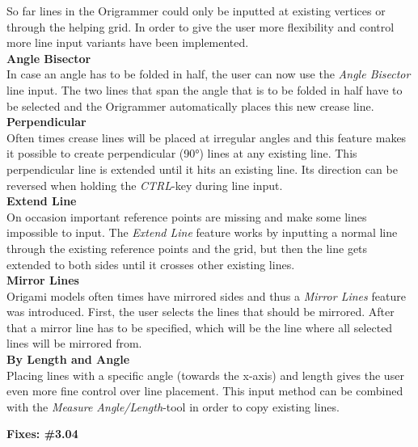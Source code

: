 So far lines in the Origrammer could only be inputted at existing vertices or through the helping grid. In order to give the user more flexibility and control more line input variants have been implemented.\\
\newline
\noindent \textbf{Angle Bisector}\\
\noindent In case an angle has to be folded in half, the user can now use the \emph{Angle Bisector} line input. The two lines that span the angle that is to be folded in half have to be selected and the Origrammer automatically places this new crease line.\\
\newline
\noindent \textbf{Perpendicular}\\
\noindent Often times crease lines will be placed at irregular angles and this feature makes it possible to create perpendicular (90°) lines at any existing line. This perpendicular line is extended until it hits an existing line. Its direction can be reversed when holding the \emph{CTRL}-key during line input.\\
\newline
\noindent \textbf{Extend Line}\\
\noindent On occasion important reference points are missing and make some lines impossible to input. The \emph{Extend Line} feature works by inputting a normal line through the existing reference points and the grid, but then the line gets extended to both sides until it crosses other existing lines.\\
\newline
\noindent \textbf{Mirror Lines}\\
\noindent Origami models often times have mirrored sides and thus a \emph{Mirror Lines} feature was introduced. First, the user selects  the lines that should be mirrored. After that a mirror line has to be specified, which will be the line where all selected lines will be mirrored from.\\
\newline
\noindent \textbf{By Length and Angle}\\
\noindent Placing lines with a specific angle (towards the x-axis) and length gives the user even more fine control over line placement. This input method can be combined with the \emph{Measure Angle/Length}-tool in order to copy existing lines.

\textbf{Fixes: \#3.04}